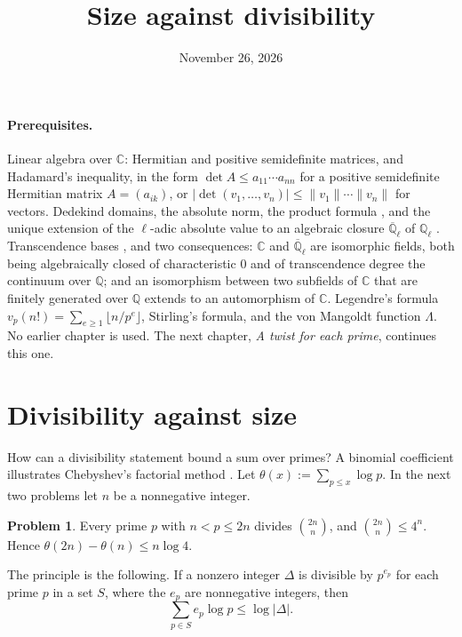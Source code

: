 \documentclass[reqno]{amsart}
\title{Size against divisibility}
\author{}
\date{November 26, 2026}
\newcounter{chap}
\theoremstyle{definition}
\newtheorem{problem}{Problem}[section]
\theoremstyle{plain}
\newcommand{\Q}{\mathbb{Q}}
\newcommand{\C}{\mathbb{C}}
\newcommand{\Qlb}{\overline{\Q}_\ell}
\begin{document}
\maketitle
{}\label{chap}

\paragraph{Prerequisites.}
Linear algebra over \(\C\): Hermitian and positive semidefinite matrices, and Hadamard's inequality, in the form \(\det A \le a_{11} \cdots a_{nn}\) for a positive semidefinite Hermitian matrix \(A = (a_{ik})\), or \(\lvert \det(v_1, \dots, v_n) \rvert \le \lVert v_1 \rVert \cdots \lVert v_n \rVert\) for vectors.  Dedekind domains, the absolute norm, the product formula \cite[Ch.~I and Ch.~III]{Ne}, and the unique extension of the \(\ell\)-adic absolute value to an algebraic closure \(\Qlb\) of \(\Q_\ell\) \cite[Ch.~II, \S4]{Ne}.  Transcendence bases \cite[Ch.~VIII, \S1]{La}, and two consequences: \(\C\) and \(\Qlb\) are isomorphic fields, both being algebraically closed of characteristic \(0\) and of transcendence degree the continuum over \(\Q\); and an isomorphism between two subfields of \(\C\) that are finitely generated over \(\Q\) extends to an automorphism of \(\C\).  Legendre's formula \(v_p(n!) = \sum_{e \ge 1} \lfloor n/p^e \rfloor\), Stirling's formula, and the von Mangoldt function \(\Lambda\).  No earlier chapter is used.  The next chapter, \emph{A twist for each prime}, continues this one.

\section{Divisibility against size}\label{sec:chebyshev}

How can a divisibility statement bound a sum over primes?  A binomial coefficient illustrates Chebyshev's factorial method \cite{Ch}.  Let \(\theta(x) := \sum_{p \le x} \log p\).  In the next two problems let \(n\) be a nonnegative integer.

\begin{problem}\label{pr:binomial}
Every prime \(p\) with \(n < p \le 2n\) divides \(\binom{2n}{n}\), and \(\binom{2n}{n} \le 4^n\).  Hence \(\theta(2n) - \theta(n) \le n \log 4\).
\end{problem}

The principle is the following.  If a nonzero integer \(\Delta\) is divisible by \(p^{e_p}\) for each prime \(p\) in a set \(S\), where the \(e_p\) are nonnegative integers, then
\begin{equation}\label{eq:det}
  \sum_{p \in S} e_p \log p \le \log \lvert \Delta \rvert .
\end{equation}
\end{document}
